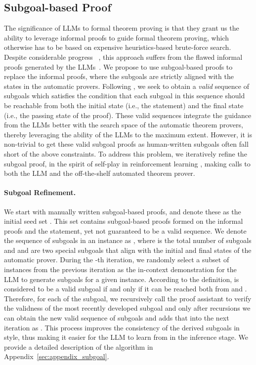 \documentclass{article}
\begin{document}
\subsection{Subgoal-based Proof}
\label{sec:subgoal-based formatting}
The significance of LLMs to formal theorem proving is that they grant us the ability to leverage informal proofs to guide formal theorem proving, which otherwise has to be based on expensive heuristics-based brute-force search. Despite considerable progress ~\cite{lewkowycz2022solving,2023arXiv230308774O}, this approach suffers from the flawed informal proofs generated by the LLMs~\cite{jiang2022draft}. We propose to use subgoal-based proofs to replace the informal proofs, where the subgoals are strictly aligned with the states in the automatic provers.  Following \citet{zhang2021c}, we seek to obtain a \emph{valid} sequence of subgoals which satisfies the condition that each subgoal in this sequence should be reachable from both the initial state (i.e., the statement) and the final state (i.e., the passing state of the proof). These valid sequences integrate the guidance from the LLMs better with the search space of the automatic theorem provers, thereby leveraging the ability of the LLMs to the maximum extent. However, it is non-trivial to get these valid subgoal proofs as human-written subgoals often fall short of the above constraints. To address this problem, we iteratively refine the subgoal proof, in the spirit of self-play in reinforcement learning \cite{silver2016mastering}, making calls to both the LLM and the off-the-shelf automated theorem prover.

\paragraph{Subgoal Refinement.}
We start with manually written subgoal-based proofs, and denote these as the initial seed set . This set contains subgoal-based proofs formed on the informal proofs and the statement, yet not guaranteed to be a valid sequence. We denote the sequence of subgoals in an instance as , where  is the total number of subgoals and  and  are two special subgoals that align with the initial and final states of the automatic prover. During the -th iteration, we randomly select a subset of instances from the previous iteration  as the in-context demonstration for the LLM to generate subgoals for a given instance. According to the definition,  is considered to be a valid subgoal if and only if it can be reached both from  and . Therefore, for each of the subgoal, we recursively call the proof assistant to verify the validness of the most recently developed subgoal and only after  recursions we can obtain the new valid sequence of subgoals and adds that into the next iteration as . This process improves the consistency of the derived subgoals in style, thus making it easier for the LLM to learn from in the inference stage. We provide a detailed description of the algorithm in Appendix~\ref{sec:appendix_subgoal}. 
\end{document}
